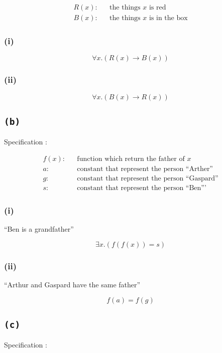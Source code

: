 \documentclass[a4paper,11pt]{report}
\begin{document}
\begin{align*}
  R(x) : && \text{the things $x$ is red} \\
  B(x) : && \text{the things $x$ is in the box}
\end{align*}

\subsubsection*{(i)}
\[
  \forall x.(R(x) \to B(x))
\]

\subsubsection*{(ii)}
\[
  \forall x.(B(x) \to R(x))
\]

\subsection*{\texttt{(b)}}

Specification :

\begin{align*}
  f(x) : && \text{function which return the father of $x$} \\
  a : && \text{constant that represent the person ``Arther''} \\
  g : && \text{constant that represent the person ``Gaspard''} \\
  s : && \text{constant that represent the person ``Ben'''}
\end{align*}


\subsubsection*{(i)}

``Ben is a grandfather''

\[
  \exists x.(f(f(x)) = s)
\]

\subsubsection*{(ii)}

``Arthur and Gaspard have the same father''

\[
  f(a) = f(g)
\]

\subsection*{\texttt{(c)}}

Specification :
\end{document}
